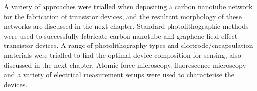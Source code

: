 \documentclass[
  letterpaper,
  DIV=11,
  numbers=noendperiod]{scrartcl}
\begin{document}
A variety of approaches were trialled when depositing a carbon nanotube
network for the fabrication of transistor devices, and the resultant
morphology of these networks are discussed in the next chapter. Standard
photolithographic methods were used to successfully fabricate carbon
nanotube and graphene field effect transistor devices. A range of
photolithography types and electrode/encapsulation materials were
trialled to find the optimal device composition for sensing, also
discussed in the next chapter. Atomic force microscopy, fluorescence
microscopy and a variety of electrical measurement setups were used to
characterise the devices.
\end{document}
